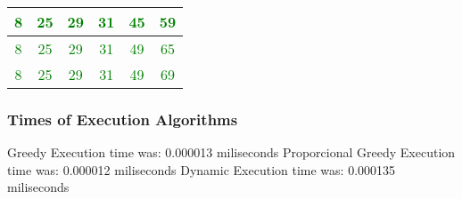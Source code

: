 \documentclass[12]{beamer}
\begin{document}
\begin{frame}
\begin{center}
\begin{adjustbox}{max width=\textwidth}
\begin{tabular}{ |c|c|c|c|c|c|}
\hline
 \textcolor{green}{8} & \textcolor{green}{25} & \textcolor{green}{29} & \textcolor{green}{31} & \textcolor{green}{45} & \textcolor{green}{59}\\ 
\hline
 \textcolor{green}{8} & \textcolor{green}{25} & \textcolor{green}{29} & \textcolor{green}{31} & \textcolor{green}{49} & \textcolor{green}{65}\\ 
\hline
 \textcolor{green}{8} & \textcolor{green}{25} & \textcolor{green}{29} & \textcolor{green}{31} & \textcolor{green}{49} & \textcolor{green}{69}\\ 
\hline
\end{tabular}
\end{adjustbox}
\end{center}

\end{frame}
\begin{frame}
\frametitle{Times of Execution Algorithms}

\begin{center}
Greedy Execution time was:  0.000013 miliseconds 
\newline
Proporcional Greedy Execution time was:  0.000012    miliseconds
Dynamic Execution time was:  0.000135  miliseconds 
\end{center}

\end{frame}
\end{document}
